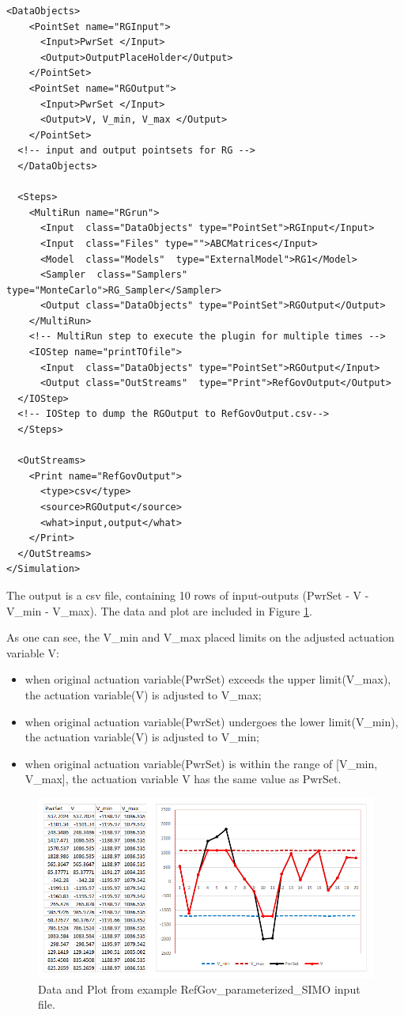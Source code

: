 \begin{lstlisting}[style=XML,morekeywords={anAttribute},
caption=Input File Example using RefGov.RefGov\_SIMO ExternalModel., label=lst:InputRGSIMOExample]
  <DataObjects>
    <PointSet name="RGInput">
      <Input>PwrSet </Input>
      <Output>OutputPlaceHolder</Output>
    </PointSet>
    <PointSet name="RGOutput">
      <Input>PwrSet </Input>
      <Output>V, V_min, V_max </Output>
    </PointSet>
  <!-- input and output pointsets for RG -->
  </DataObjects>

  <Steps>
    <MultiRun name="RGrun">
      <Input  class="DataObjects" type="PointSet">RGInput</Input>
      <Input  class="Files" type="">ABCMatrices</Input>
      <Model  class="Models"  type="ExternalModel">RG1</Model>
      <Sampler  class="Samplers"  type="MonteCarlo">RG_Sampler</Sampler>
      <Output class="DataObjects" type="PointSet">RGOutput</Output>
    </MultiRun>
    <!-- MultiRun step to execute the plugin for multiple times -->	
    <IOStep name="printTOfile">
      <Input  class="DataObjects" type="PointSet">RGOutput</Input>
      <Output class="OutStreams"  type="Print">RefGovOutput</Output>
  </IOStep>
  <!-- IOStep to dump the RGOutput to RefGovOutput.csv-->
  </Steps>

  <OutStreams>
    <Print name="RefGovOutput">
      <type>csv</type>
      <source>RGOutput</source>
      <what>input,output</what>
    </Print>
  </OutStreams>
</Simulation>
\end{lstlisting}
The output is a csv file, containing 10 rows of input-outputs (PwrSet - V - V\_min - V\_max). The data and plot are included 
in Figure \ref{fig:RGSIMOoutput}. 

As one can see, the V\_min and V\_max placed limits on the adjusted actuation variable V:
\begin{itemize}
  \item when original actuation variable(PwrSet) exceeds the upper limit(V\_max), the actuation variable(V) is adjusted to 
  V\_max;
  \item when original actuation variable(PwrSet) undergoes the lower limit(V\_min), the actuation variable(V) is adjusted to 
  V\_min;
  \item when original actuation variable(PwrSet) is within the range of [V\_min, V\_max], the actuation variable V has the 
  same value as PwrSet.
\end{itemize}


\begin{figure}[h]
  \centerline{\includegraphics[width=6in]{include/RefGovOutput.png}}
  \caption{Data and Plot from example RefGov\_parameterized\_SIMO input file.}
  \label{fig:RGSIMOoutput}
\end{figure}

